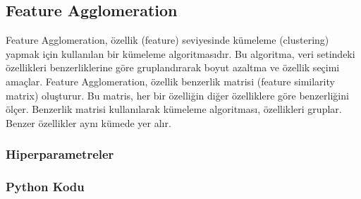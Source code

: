 \newpage

\subsection{Feature Agglomeration}
Feature Agglomeration, özellik (feature) seviyesinde kümeleme (clustering) yapmak için kullanılan bir kümeleme algoritmasıdır. Bu algoritma, veri setindeki özellikleri benzerliklerine göre gruplandırarak boyut azaltma ve özellik seçimi amaçlar. Feature Agglomeration, özellik benzerlik matrisi (feature similarity matrix) oluşturur. Bu matris, her bir özelliğin diğer özelliklere göre benzerliğini ölçer. Benzerlik matrisi kullanılarak kümeleme algoritması, özellikleri gruplar. Benzer özellikler aynı kümede yer alır.

\subsubsection{Hiperparametreler}

\begin{table}[h]
\centering
{\scriptsize\renewcommand{\arraystretch}{0.4}
{}}
\end{table}

\newpage

\subsubsection{Python Kodu}

